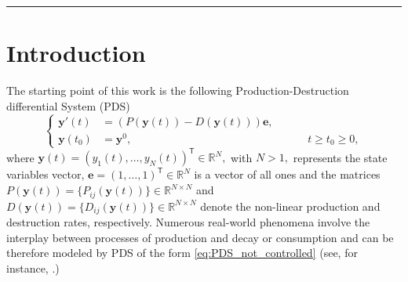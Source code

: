 \documentclass[10pt]{article}
\theoremstyle{remark}
\newcommand{\tpose}{^\mathsf{T}}
\theoremstyle{definition}
\theoremstyle{remark}
\begin{document}
\noindent\rule{\linewidth}{0.5pt} %

\section{Introduction}\label{sec:introduction}
The starting point of this work is the following Production-Destruction differential System (PDS)
\begin{equation}\label{eq:PDS_not_controlled}
\left\{
\begin{aligned}
    \bm{y}'(t)&=(P(\bm{y}(t))-D(\bm{y}(t))) \bm{e}, \\
    \bm{y}(t_0)&=\bm{y}^0, \qquad \qquad \qquad  \qquad \qquad \qquad  \qquad \qquad  t\geq t_0\geq 0,
\end{aligned}
\right.
\end{equation}
where $\bm{y}(t)=(y_1(t),\dots,y_N(t))\tpose{} \in \mathbb{R}^N,$ with $N>1,$ represents the state variables vector, $\bm{e}=(1,\dots,1)\tpose{}\in \mathbb{R}^N$ is a vector of all ones and the matrices $P(\bm{y}(t))=\{P_{ij}(\bm{y}(t))\}\in \mathbb{R}^{N\times N}$ and $D(\bm{y}(t))=\{D_{ij}(\bm{y}(t))\}\in \mathbb{R}^{N\times N}$ denote the non-linear production and destruction rates, respectively. Numerous real-world phenomena involve the interplay between processes of production and decay or consumption and can be therefore modeled by PDS of the form \eqref{eq:PDS_not_controlled} (see, for instance, \cite{Higham,CdS,Epidemic_PDS_1,Epidemic_PDS_2,Bacteria_PDS}.)
\end{document}
